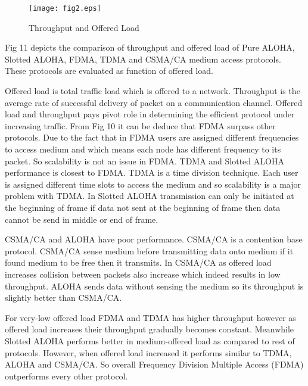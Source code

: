 \documentclass[11pt, conference, compsocconf, onecolumn]{IEEEtran}
\begin{document}
\begin{figure}[!h]
\centering
\caption{Throughput and Offered Load}
\texttt{[image: fig2.eps]}
\end{figure}

Fig 11 depicts the comparison of throughput and offered load of Pure ALOHA, Slotted ALOHA, FDMA, TDMA and CSMA/CA medium access protocols. These protocols are evaluated as function of offered load.

Offered load is total traffic load which is offered to a network. Throughput is the average rate of successful delivery of packet on a communication channel. Offered load and throughput pays pivot role in determining the efficient protocol under increasing traffic.
From Fig 10 it can be deduce that FDMA surpass other protocols. Due to the fact that in FDMA users are assigned different frequencies to access medium and which means each node has different frequency to its packet. So scalability is not an issue in FDMA. TDMA and Slotted ALOHA performance is closest to FDMA. TDMA is a time division technique. Each user is assigned different time slots to access the medium and so scalability is a major problem with TDMA. In Slotted ALOHA transmission can only be initiated at the beginning of frame if data not sent at the beginning of frame then data cannot be send in middle or end of frame.

CSMA/CA and ALOHA have poor performance. CSMA/CA is a contention base protocol. CSMA/CA sense medium before transmitting data onto medium if it found medium to be free then it transmits. In CSMA/CA as offered load increases  collision between packets also increase which indeed results in low throughput. ALOHA sends data without sensing the medium so its throughput is slightly better than CSMA/CA.

For very-low offered load FDMA and TDMA has higher throughput however as offered load increases their throughput gradually becomes constant. Meanwhile Slotted ALOHA performs better in medium-offered load as compared to rest of protocols. However, when offered load increased it performs similar to TDMA, ALOHA and CSMA/CA. So overall Frequency Division Multiple Access (FDMA) outperforms every other protocol.
\end{document}
